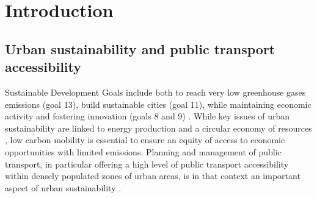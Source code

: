 \documentclass{article}
\begin{document}









\section{Introduction}

\subsection{Urban sustainability and public transport accessibility}

Sustainable Development Goals include both to reach very low greenhouse gases emissions (goal 13), build sustainable cities (goal 11), while maintaining economic activity and fostering innovation (goals 8 and 9) \cite{griggs2014integrated}. While key issues of urban sustainability are linked to energy production and a circular economy of resources \cite{kennedy2012sustainable}, low carbon mobility is essential to ensure an equity of access to economic opportunities with limited emissions. Planning and management of public transport, in particular offering a high level of public transport accessibility within densely populated zones of urban areas, is in that context an important aspect of urban sustainability \cite{hayashi2004urban}.
\end{document}
